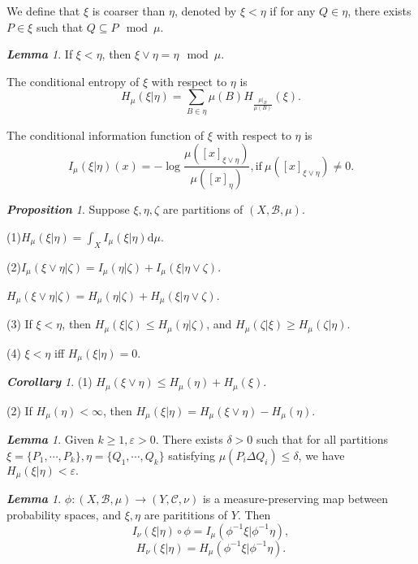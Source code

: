 \documentclass[10pt, a4paper, oneside]{report}
\numberwithin{equation}{chapter}
\theoremstyle{remark}
\newtheorem{lemma}[definition]{\bf{Lemma}}
\newtheorem{proposition}[definition]{\bf{Proposition}}
\newtheorem{corollary}[definition]{\bf{Corollary}}
\theoremstyle{remark}
\begin{document}
We define that $\xi$ is coarser than $\eta$, denoted by $\xi<\eta$ if for any $Q\in\eta$, there exists $P\in\xi$ such that $Q\subseteq P\mod\mu$. 

\begin{lemma}
    If $\xi<\eta$, then $\xi\vee\eta=\eta\mod\mu$.
\end{lemma}

The conditional entropy of $\xi$ with respect to $\eta$ is $$H_\mu(\xi|\eta)=\sum\limits_{B\in\eta}\mu(B)H_{\frac{\mu|_B}{\mu(B)}}(\xi).$$

The conditional information function of $\xi$ with respect to $\eta$ is $$I_\mu(\xi|\eta)(x)=-\log\frac{\mu([x]_{\xi\vee\eta})}{\mu([x]_\eta)},\text{if}~\mu([x]_{\xi\vee\eta})\not=0.$$

\begin{proposition}
    Suppose $\xi,\eta,\zeta$ are partitions of $(X,\mathcal{B},\mu)$.

    (1)$H_\mu(\xi|\eta)=\int_XI_\mu(\xi|\eta)\mathrm{d}\mu$.

    (2)$I_\mu(\xi\vee\eta|\zeta)=I_\mu(\eta|\zeta)+I_\mu(\xi|\eta\vee\zeta)$.

    $H_\mu(\xi\vee\eta|\zeta)=H_\mu(\eta|\zeta)+H_\mu(\xi|\eta\vee\zeta)$.

    (3) If $\xi<\eta$, then $H_\mu(\xi|\zeta)\leqslant H_\mu(\eta|\zeta)$, and $H_\mu(\zeta|\xi)\geqslant H_\mu(\zeta|\eta)$.

    (4) $\xi<\eta$ iff $H_\mu(\xi|\eta)=0$.
\end{proposition}

\begin{corollary}
    (1) $H_\mu(\xi\vee\eta)\leqslant H_\mu(\eta)+H_\mu(\xi)$.

    (2) If $H_\mu(\eta)<\infty$, then $H_\mu(\xi|\eta)=H_\mu(\xi\vee\eta)-H_\mu(\eta)$.
\end{corollary}

\begin{lemma}
    Given $k\geqslant 1,\varepsilon>0$. There exists $\delta>0$ such that for all partitions $\xi=\{P_1,\cdots,P_k\},\eta=\{Q_1,\cdots,Q_k\}$ satisfying $\mu(P_i\Delta Q_i)\leqslant \delta$, we have $H_\mu(\xi|\eta)<\varepsilon.$
\end{lemma}

\begin{lemma}
    $\phi:(X,\mathcal{B},\mu)\rightarrow (Y,\mathcal{C},\nu)$ is a measure-preserving map between probability spaces, and $\xi,\eta$ are parititions of $Y$. Then
    $$I_\nu(\xi|\eta)\circ\phi=I_\mu(\phi^{-1}\xi|\phi^{-1}\eta),$$
    $$ H_\nu(\xi|\eta)=H_\mu(\phi^{-1}\xi|\phi^{-1}\eta).$$
\end{lemma}
\end{document}
